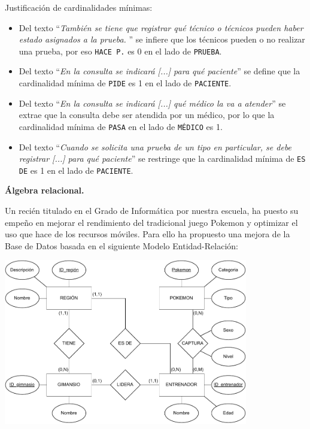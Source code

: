 \documentclass[
    12pt,
    a4paper,
    addpoints,
    answers,
    convocatoria=ord,
    titulacion=NoCD,
    curso=2023/2024,
]{db-exam}
\begin{document}
\begin{questions}
\begin{solution}
    Justificación de cardinalidades mínimas:
    \begin{itemize}
        \item Del texto ``\textit{También se tiene que registrar qué técnico o técnicos pueden haber estado asignados a la prueba. }'' se infiere que los técnicos pueden o no realizar una prueba, por eso \texttt{HACE P.} es 0 en el lado de \texttt{PRUEBA}.
        \item Del texto ``\textit{En la consulta se indicará [...] para qué paciente}'' se define que la cardinalidad mínima de \texttt{PIDE} es 1 en el lado de \texttt{PACIENTE}.
        \item Del texto ``\textit{En la consulta se indicará [...] qué médico la va a atender}'' se extrae que la consulta debe ser atendida por un médico, por lo que la cardinalidad mínima de \texttt{PASA} en el lado de \texttt{MÉDICO} es 1.
        \item Del texto ``\textit{Cuando se solicita una prueba de un tipo en particular, se debe registrar [...] para qué paciente}'' se restringe que la cardinalidad mínima de \texttt{ES DE} es 1 en el lado de \texttt{PACIENTE}.
    \end{itemize}
\end{solution}

\newpage
\question[1\half] \textbf{Álgebra relacional.}

Un recién titulado en el Grado de Informática por nuestra escuela, ha puesto su empeño en mejorar el rendimiento del tradicional juego Pokemon y optimizar el uso que hace de los recursos móviles. Para ello ha propuesto una mejora de la Base de Datos basada en el siguiente Modelo Entidad-Relación:

\begin{center}
\includegraphics[width=0.8\textwidth]{figs/bbdd-2023-2024-ordinaria/mer-pokemon.pdf}
\end{center}


\end{questions}
\end{document}
